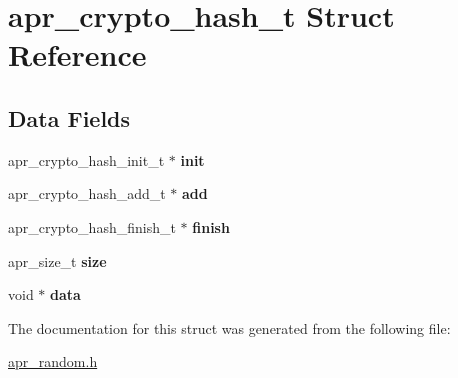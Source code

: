 \hypertarget{structapr__crypto__hash__t}{\section{apr\-\_\-crypto\-\_\-hash\-\_\-t Struct Reference}
\label{structapr__crypto__hash__t}
}
\subsection*{Data Fields}
\begin{DoxyCompactItemize}
\item 
\hypertarget{structapr__crypto__hash__t_a3b0a8b85bc2207235024a9e64febab69}{apr\-\_\-crypto\-\_\-hash\-\_\-init\-\_\-t $\ast$ {\bfseries init}}\label{structapr__crypto__hash__t_a3b0a8b85bc2207235024a9e64febab69}

\item 
\hypertarget{structapr__crypto__hash__t_a60c77281aca26fdb500c3ef899908abb}{apr\-\_\-crypto\-\_\-hash\-\_\-add\-\_\-t $\ast$ {\bfseries add}}\label{structapr__crypto__hash__t_a60c77281aca26fdb500c3ef899908abb}

\item 
\hypertarget{structapr__crypto__hash__t_abd6933f64b61c595788ddf0f16d5b48c}{apr\-\_\-crypto\-\_\-hash\-\_\-finish\-\_\-t $\ast$ {\bfseries finish}}\label{structapr__crypto__hash__t_abd6933f64b61c595788ddf0f16d5b48c}

\item 
\hypertarget{structapr__crypto__hash__t_ade59f47b349e3a9eef98097fb87fbf72}{apr\-\_\-size\-\_\-t {\bfseries size}}\label{structapr__crypto__hash__t_ade59f47b349e3a9eef98097fb87fbf72}

\item 
\hypertarget{structapr__crypto__hash__t_a0211f5be5ddce65dee1ea0720d39e8e3}{void $\ast$ {\bfseries data}}\label{structapr__crypto__hash__t_a0211f5be5ddce65dee1ea0720d39e8e3}

\end{DoxyCompactItemize}


The documentation for this struct was generated from the following file\-:\begin{DoxyCompactItemize}
\item 
\hyperlink{apr__random_8h}{apr\-\_\-random.\-h}\end{DoxyCompactItemize}
